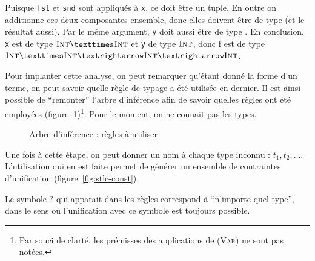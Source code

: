 Puisque \texttt{fst} et \texttt{snd} sont appliqués à \texttt{x}, ce doit être
un tuple. En outre on additionne ces deux composantes ensemble, donc elles
doivent être de type \tInt (et le résultat aussi). Par le même argument,
\texttt{y} doit aussi être de type \tInt. En conclusion, \texttt{x} est de type
$\tInt × \tInt$ et \texttt{y} de type $\textsc{Int}$, donc f est de type $\tInt × \tInt
→ \tInt → \tInt$.

Pour implanter cette analyse, on peut remarquer qu'étant donné la forme d'un
terme, on peut savoir quelle règle de typage a été utilisée en dernier. Il est
ainsi possible de ``remonter'' l'arbre d'inférence afin de savoir quelles règles
ont été employées (figure~\ref{fig:inftree-rules})\footnote{Par souci de clarté,
les prémisses des applications de \textsc{(Var)} ne sont pas notées.}. Pour le
moment, on ne connait pas les types.


\begin{figure} %
\def\disptypeR#1#2{:#1}



\caption{Arbre d'inférence : règles à utiliser}
\label{fig:inftree-rules}
\end{figure} %

Une fois à cette étape, on peut donner un nom à chaque type inconnu : $t_1, t_2,
\ldots$. L'utilisation qui en est faite permet de générer un ensemble de
contraintes d'unification (figure~\ref{fig:stlc-const}).

Le symbole $?$ qui apparait dans les règles correspond à ``n'importe quel
type'', dans le sens où l'unification avec ce symbole est toujours possible.

